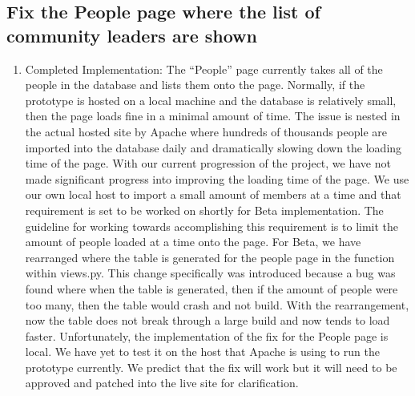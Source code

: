 \documentclass[draftclsnofoot,10pt,onecolumn]{IEEEtran} %
\begin{document}
\subsection{Fix the People page where the list of community leaders are shown}
\begin{enumerate}[label*=\arabic*.]
  \item Completed Implementation: The “People” page currently takes all of the
    people in the database and lists them onto the page. Normally, if the
    prototype is hosted on a local machine and the database is relatively small,
    then the page loads fine in a minimal amount of time. The issue is nested in
    the actual hosted site by Apache where hundreds of thousands people are
    imported into the database daily and dramatically slowing down the loading
    time of the page.  With our current progression of the project, we have not
    made significant progress into improving the loading time of the page. We
    use our own local host to import a small amount of members at a time and
    that requirement is set to be worked on shortly for Beta implementation. The
    guideline for working towards accomplishing this requirement is to limit the
    amount of people loaded at a time onto the page. For Beta, we have
    rearranged where the table is generated for the people page in the function
    within views.py. This change specifically was introduced because a bug was
    found where when the table is generated, then if the amount of people were
    too many, then the table would crash and not build. With the rearrangement,
    now the table does not break through a large build and now tends to load
    faster. Unfortunately, the implementation of the fix for the People page is
    local. We have yet to test it on the host that Apache is using to run the
    prototype currently. We predict that the fix will work but it will need to
    be approved and patched into the live site for clarification.
\end{enumerate}
\end{document}
